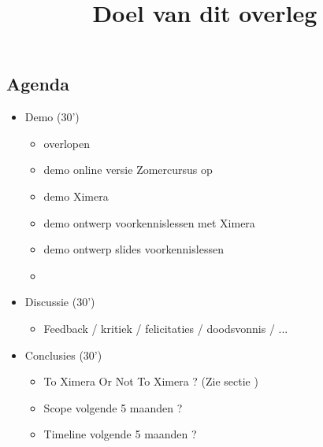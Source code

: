 \documentclass{ximera}
\title{Doel van dit overleg}
\begin{document}
\begin{abstract}
\end{abstract}
\maketitle

\subsection{Agenda}
\begin{itemize}
    \item Demo (30')
    \begin{itemize}
        \item overlopen 
        \item demo online versie Zomercursus op 
        \item demo Ximera 
        \item demo ontwerp voorkennislessen met Ximera 
        \item demo ontwerp slides voorkennislessen 
        \item {}
    \end{itemize}
    \item Discussie (30')
    \begin{itemize}
        \item Feedback / kritiek / felicitaties / doodsvonnis / ...
    \end{itemize}

    \item Conclusies  (30')
        \begin{itemize}
        \item To Ximera Or Not To Ximera ? (Zie sectie )
        \item Scope volgende 5 maanden ?
        \item Timeline volgende 5 maanden ?
    \end{itemize}
\end{itemize}

\end{document}
